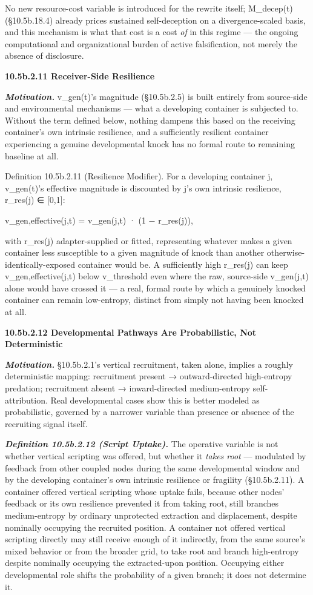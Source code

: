 \documentclass[
]{article}
\begin{document}
No new resource-cost variable is introduced for the rewrite itself;
M\_decep(t) (§10.5b.18.4) already prices sustained self-deception on a
divergence-scaled basis, and this mechanism is what that cost is a cost
\emph{of} in this regime --- the ongoing computational and
organizational burden of active falsification, not merely the absence of
disclosure.

\textbf{10.5b.2.11 Receiver-Side Resilience}

\emph{\textbf{Motivation.}} v\_gen(t)'s magnitude (§10.5b.2.5) is built
entirely from source-side and environmental mechanisms --- what a
developing container is subjected to. Without the term defined below,
nothing dampens this based on the receiving container's own intrinsic
resilience, and a sufficiently resilient container experiencing a
genuine developmental knock has no formal route to remaining baseline at
all.

Definition 10.5b.2.11 (Resilience Modifier). For a developing container
j, v\_gen(t)'s effective magnitude is discounted by j's own intrinsic
resilience, r\_res(j) ∈ {[}0,1{]}:

v\_gen,effective(j,t) = v\_gen(j,t) · (1 − r\_res(j)),

with r\_res(j) adapter-supplied or fitted, representing whatever makes a
given container less susceptible to a given magnitude of knock than
another otherwise-identically-exposed container would be. A sufficiently
high r\_res(j) can keep v\_gen,effective(j,t) below v\_threshold even
where the raw, source-side v\_gen(j,t) alone would have crossed it --- a
real, formal route by which a genuinely knocked container can remain
low-entropy, distinct from simply not having been knocked at all.

\textbf{10.5b.2.12 Developmental Pathways Are Probabilistic, Not
Deterministic}

\emph{\textbf{Motivation.}} §10.5b.2.1's vertical recruitment, taken
alone, implies a roughly deterministic mapping: recruitment present →
outward-directed high-entropy predation; recruitment absent →
inward-directed medium-entropy self-attribution. Real developmental
cases show this is better modeled as probabilistic, governed by a
narrower variable than presence or absence of the recruiting signal
itself.

\emph{\textbf{Definition 10.5b.2.12 (Script Uptake).}} The operative
variable is not whether vertical scripting was offered, but whether it
\emph{takes root} --- modulated by feedback from other coupled nodes
during the same developmental window and by the developing container's
own intrinsic resilience or fragility (§10.5b.2.11). A container offered
vertical scripting whose uptake fails, because other nodes' feedback or
its own resilience prevented it from taking root, still branches
medium-entropy by ordinary unprotected extraction and displacement,
despite nominally occupying the recruited position. A container not
offered vertical scripting directly may still receive enough of it
indirectly, from the same source's mixed behavior or from the broader
grid, to take root and branch high-entropy despite nominally occupying
the extracted-upon position. Occupying either developmental role shifts
the probability of a given branch; it does not determine it.
\end{document}
